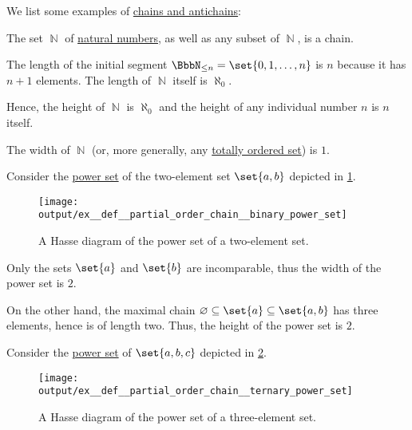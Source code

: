 \begin{example}\label{ex:def:partial_order_chain}
  We list some examples of \hyperref[def:partial_order_chain]{chains and antichains}:
  \begin{thmenum}
     The set \( \BbbN \) of \hyperref[def:natural_numbers]{natural numbers}, as well as any subset of \( \BbbN \), is a chain.

    The length of the initial segment \( \BbbN_{\leq n} = \set{ 0, 1, \ldots, n } \) is \( n \) because it has \( n + 1 \) elements. The length of \( \BbbN \) itself is \( \aleph_0 \).

    Hence, the height of \( \BbbN \) is \( \aleph_0 \) and the height of any individual number \( n \) is \( n \) itself.

    The width of \( \BbbN \) (or, more generally, any \hyperref[def:totally_ordered_set]{totally ordered set}) is \( 1 \).

     Consider the \hyperref[def:basic_set_operations/power_set]{power set} of the two-element set \( \set{ a, b } \) depicted in \cref{fig:ex:def:partial_order_chain/binary_power_set}.

    \begin{figure}[!ht]
      \hfill
      \texttt{[image: output/ex\_\_def\_\_partial\_order\_chain\_\_binary\_power\_set]}
      \hfill\hfill
      \caption{A Hasse diagram of the power set of a two-element set.}
      \label{fig:ex:def:partial_order_chain/binary_power_set}
    \end{figure}

    Only the sets \( \set{ a } \) and \( \set{ b } \) are incomparable, thus the width of the power set is \( 2 \).

    On the other hand, the maximal chain \( \varnothing \subseteq \set{ a } \subseteq \set{ a, b } \) has three elements, hence is of length two. Thus, the height of the power set is \( 2 \).

     Consider the \hyperref[def:basic_set_operations/power_set]{power set} of \( \set{ a, b, c } \) depicted in \cref{fig:ex:def:partial_order_chain/ternary_power_set}.

    \begin{figure}[!ht]
      \hfill
      \texttt{[image: output/ex\_\_def\_\_partial\_order\_chain\_\_ternary\_power\_set]}
      \hfill\hfill
      \caption{A Hasse diagram of the power set of a three-element set.}
      \label{fig:ex:def:partial_order_chain/ternary_power_set}
    \end{figure}


\end{thmenum}
\end{example}
